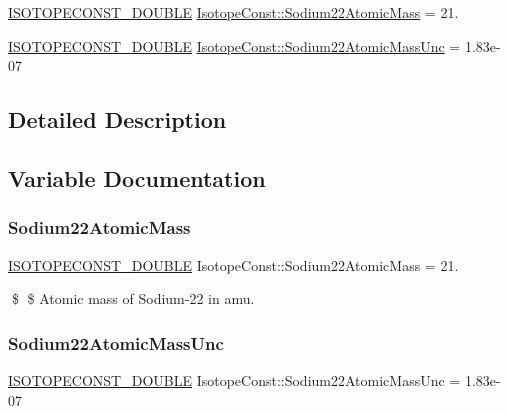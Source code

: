 \begin{DoxyCompactItemize}
\item 
\mbox{\hyperlink{group___isotope_const-_macros_ga8f45a7272ce02c0b4c65c44636ed719a}{I\+S\+O\+T\+O\+P\+E\+C\+O\+N\+S\+T\+\_\+\+D\+O\+U\+B\+LE}} \mbox{\hyperlink{group___isotope_const-_sodium-_na22_ga9c741eb05d70813ca18049203aef072b}{Isotope\+Const\+::\+Sodium22\+Atomic\+Mass}} = 21.
\item 
\mbox{\hyperlink{group___isotope_const-_macros_ga8f45a7272ce02c0b4c65c44636ed719a}{I\+S\+O\+T\+O\+P\+E\+C\+O\+N\+S\+T\+\_\+\+D\+O\+U\+B\+LE}} \mbox{\hyperlink{group___isotope_const-_sodium-_na22_ga850582bb62704fbb8500f52f2a6062ad}{Isotope\+Const\+::\+Sodium22\+Atomic\+Mass\+Unc}} = 1.\+83e-\/07
\end{DoxyCompactItemize}


\subsection{Detailed Description}


\subsection{Variable Documentation}
\mbox{\label{group___isotope_const-_sodium-_na22_ga9c741eb05d70813ca18049203aef072b}} 
\subsubsection{\texorpdfstring{Sodium22\+Atomic\+Mass}{Sodium22AtomicMass}}
{\footnotesize\ttfamily \mbox{\hyperlink{group___isotope_const-_macros_ga8f45a7272ce02c0b4c65c44636ed719a}{I\+S\+O\+T\+O\+P\+E\+C\+O\+N\+S\+T\+\_\+\+D\+O\+U\+B\+LE}} Isotope\+Const\+::\+Sodium22\+Atomic\+Mass = 21.}

\$ \$ Atomic mass of Sodium-\/22 in amu. \mbox{\label{group___isotope_const-_sodium-_na22_ga850582bb62704fbb8500f52f2a6062ad}} 
\subsubsection{\texorpdfstring{Sodium22\+Atomic\+Mass\+Unc}{Sodium22AtomicMassUnc}}
{\footnotesize\ttfamily \mbox{\hyperlink{group___isotope_const-_macros_ga8f45a7272ce02c0b4c65c44636ed719a}{I\+S\+O\+T\+O\+P\+E\+C\+O\+N\+S\+T\+\_\+\+D\+O\+U\+B\+LE}} Isotope\+Const\+::\+Sodium22\+Atomic\+Mass\+Unc = 1.\+83e-\/07}

